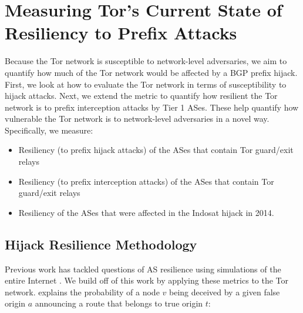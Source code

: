 \section{Measuring Tor's Current State of Resiliency to Prefix Attacks}
\label{hijack_interception_measurement}

Because the Tor network is susceptible to network-level adversaries, we aim to quantify how much of the Tor network would be affected by a BGP prefix hijack.  First, we look at how to evaluate the Tor network in terms of susceptibility to hijack attacks. Next, we extend the metric to quantify how resilient the Tor network is to prefix interception attacks by Tier 1 ASes.  These help quantify how vulnerable the Tor network is to network-level adversaries in a novel way.  Specifically, we measure:

\begin{itemize}
\item Resiliency (to prefix hijack attacks) of the ASes that contain Tor guard/exit relays
\item Resiliency (to prefix interception attacks) of the ASes that contain Tor guard/exit relays
\item Resiliency of the ASes that were affected in the Indosat hijack in 2014. 
\end{itemize}

\subsection{Hijack Resilience Methodology}
\label{hijack_methodology}

Previous work has tackled questions of AS resilience using simulations of the entire Internet \cite{lad2007understanding}.  We build off of this work by applying these metrics to the Tor network. \cite{lad2007understanding} explains the probability of a node $v$ being deceived by a given false origin $a$ announcing a route that belongs to true origin $t$:


